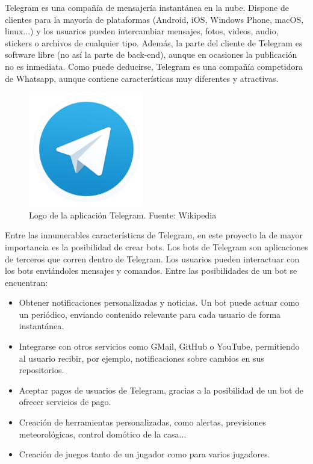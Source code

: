 Telegram es una compañía de mensajería instantánea en la nube. Dispone de clientes para la mayoría de plataformas (Android, iOS, Windows Phone, macOS, linux...) y los usuarios pueden intercambiar mensajes, fotos, videos, audio, stickers o archivos de cualquier tipo. Además, la parte del cliente de Telegram es software libre (no así la parte de back-end), aunque en ocasiones la publicación no es inmediata. Como puede deducirse, Telegram es una compañía competidora de Whatsapp, aunque contiene características muy diferentes y atractivas.\\
\begin{figure}[H]
    \centering
    \captionsetup{width=7cm}
    \includegraphics[width=5cm]{contenido/imagenes/Telegram-logo.jpg}
    \caption{Logo de la aplicación Telegram. Fuente: Wikipedia \cite{wiki:telegramImage}}
\end{figure}
Entre las innumerables características de Telegram, en este proyecto la de mayor importancia es la posibilidad de crear bots. Los bots de Telegram son aplicaciones de terceros que corren dentro de Telegram. Los usuarios pueden interactuar con los bots enviándoles mensajes y comandos. Entre las posibilidades de un bot se encuentran:
\begin{itemize}
    \item Obtener notificaciones personalizadas y noticias. Un bot puede actuar como un periódico, enviando contenido relevante para cada usuario de forma instantánea.
    \item Integrarse con otros servicios como GMail, GitHub o YouTube, permitiendo al usuario recibir, por ejemplo, notificaciones sobre cambios en sus repositorios.
    \item Aceptar pagos de usuarios de Telegram, gracias a la posibilidad de un bot de ofrecer servicios de pago.
    \item Creación de herramientas personalizadas, como alertas, previsiones meteorológicas, control domótico de la casa...
    \item Creación de juegos tanto de un jugador como para varios jugadores.
\end{itemize}

